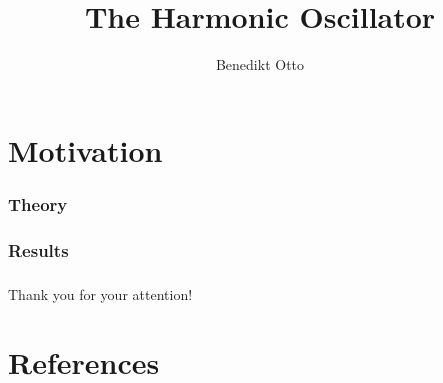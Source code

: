 \documentclass[aspectratio=169]{beamer}
\title[The Harmonic Oscillator]{The Harmonic Oscillator}
\author{Benedikt Otto}
\date{\printdate{24.03.2020}} %
\institute{Computational Physics}
\begin{document}
\begin{frame}
	\titlepage
\end{frame}


\section{Motivation}
\begin{frame}

\end{frame}

\begin{frame}
\frametitle{Theory}

\end{frame}

\begin{frame}
\frametitle{Results}

\end{frame}


\begin{frame}
\frametitle{}
\begin{center}
	Thank you for your attention!
\end{center}
\end{frame}

\section{References}
\begin{frame}

\end{frame}



\appendixstyle

\appendix
\end{document}
